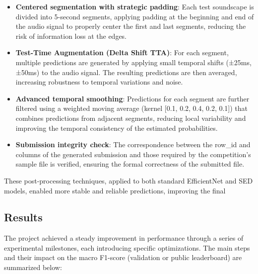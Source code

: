 \documentclass[ERTS, 2025]{ERTS}
\begin{document}
\begin{itemize}
    \item \textbf{Centered segmentation with strategic padding}: Each test soundscape is divided into 5-second segments, applying padding at the beginning and end of the audio signal to properly center the first and last segments, reducing the risk of information loss at the edges.
    \item \textbf{Test-Time Augmentation (Delta Shift TTA)}: For each segment, multiple predictions are generated by applying small temporal shifts (±25ms, ±50ms) to the audio signal. The resulting predictions are then averaged, increasing robustness to temporal variations and noise.
    \item \textbf{Advanced temporal smoothing}: Predictions for each segment are further filtered using a weighted moving average (kernel [0.1, 0.2, 0.4, 0.2, 0.1]) that combines predictions from adjacent segments, reducing local variability and improving the temporal consistency of the estimated probabilities.
    \item \textbf{Submission integrity check}: The correspondence between the row\_id and columns of the generated submission and those required by the competition's sample file is verified, ensuring the formal correctness of the submitted file.
\end{itemize}

These post-processing techniques, applied to both standard EfficientNet and SED models, enabled more stable and reliable predictions, improving the final

\subsection{Results}
The project achieved a steady improvement in performance through a series of experimental milestones, each introducing specific optimizations. The main steps and their impact on the macro F1-score (validation or public leaderboard) are summarized below:
\end{document}
